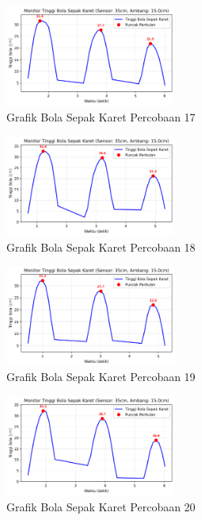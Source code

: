 \begin{figure}[htbp]
    \centering
    \includegraphics[width=0.5\textwidth]{chapters/DataPercobaan/Grafik_Bola_Sepak_Karet_17.png}
    \caption{Grafik Bola Sepak Karet Percobaan 17}
\end{figure}
\begin{figure}[htbp]
    \centering
    \includegraphics[width=0.5\textwidth]{chapters/DataPercobaan/Grafik_Bola_Sepak_Karet_18.png}
    \caption{Grafik Bola Sepak Karet Percobaan 18}
\end{figure}
\begin{figure}[htbp]
    \centering
    \includegraphics[width=0.5\textwidth]{chapters/DataPercobaan/Grafik_Bola_Sepak_Karet_19.png}
    \caption{Grafik Bola Sepak Karet Percobaan 19}
\end{figure}
\begin{figure}[htbp]
    \centering
    \includegraphics[width=0.5\textwidth]{chapters/DataPercobaan/Grafik_Bola_Sepak_Karet_20.png}
    \caption{Grafik Bola Sepak Karet Percobaan 20}
\end{figure}

